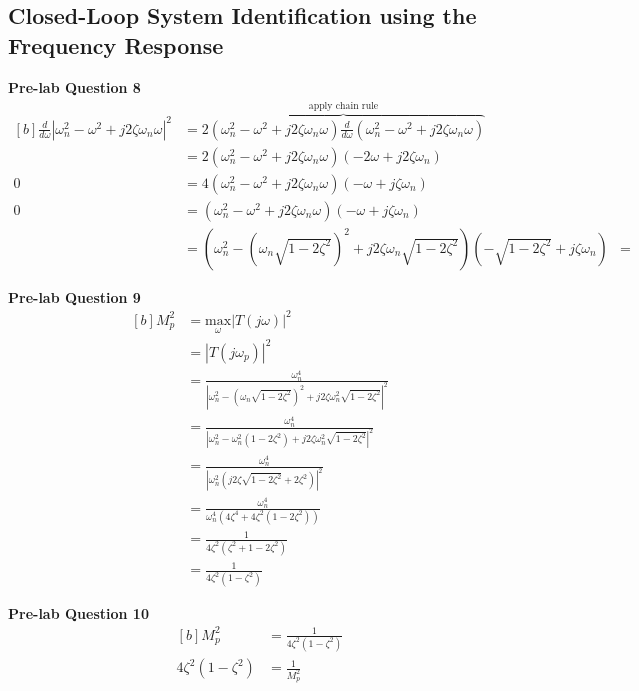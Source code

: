\documentclass[12pt]{article}
\begin{document}
\subsection{Closed-Loop System Identification using the Frequency Response}
\textbf{Pre-lab Question 8} \\
\begin{equation}
\begin{aligned}[b]
    \frac{d}{d\omega} \left|\omega_n^2 - \omega^2 + j2\zeta\omega_n\omega\right|^2 &= \overbrace{2 (\omega_n^2 - \omega^2 + j2\zeta\omega_n\omega) \frac{d}{d\omega} (\omega_n^2 - \omega^2 + j2\zeta\omega_n\omega)}^{\text{apply chain rule}} \\
    &= 2 (\omega_n^2 - \omega^2 + j2\zeta\omega_n\omega) (-2\omega + j2\zeta\omega_n) \\
    0 &= 4 (\omega_n^2 - \omega^2 + j2\zeta\omega_n\omega) (-\omega + j\zeta\omega_n) \\
    0 &= (\omega_n^2 - \omega^2 + j2\zeta\omega_n\omega) (-\omega + j\zeta\omega_n) \\
    &= (\omega_n^2 - (\omega_n\sqrt{1-2\zeta^2})^2 + j2\zeta\omega_n\sqrt{1-2\zeta^2}) (-\sqrt{1-2\zeta^2} + j\zeta\omega_n)
    &= 
\end{aligned}
\end{equation}

\textbf{Pre-lab Question 9} \\
\begin{equation} \label{eq:9}
\begin{aligned}[b]
    M_p^2 &= \underset{\omega}{\text{max}}\left| T(j\omega) \right|^2 \\
    &= \left| T(j\omega_p) \right|^2 \\
    &= \frac{\omega_n^4}{\left| \omega_n^2 - (\omega_n\sqrt{1-2\zeta^2})^2 + j2\zeta\omega_n^2\sqrt{1-2\zeta^2} \right|^2} \\
    &= \frac{\omega_n^4}{\left| \omega_n^2 - \omega_n^2(1-2\zeta^2) + j2\zeta\omega_n^2\sqrt{1-2\zeta^2} \right|^2} \\
    &= \frac{\omega_n^4}{\left| \omega_n^2 \left( j2\zeta\sqrt{1-2\zeta^2} + 2\zeta^2 \right) \right|^2} \\
    &= \frac{\omega_n^4}{\omega_n^4 (4\zeta^4 + 4\zeta^2 (1-2\zeta^2))} \\
    &= \frac{1}{4\zeta^2 (\zeta^2 + 1 - 2\zeta^2)} \\
    &= \frac{1}{4\zeta^2 (1 - \zeta^2)}
\end{aligned}
\end{equation}

\textbf{Pre-lab Question 10} \\
\begin{equation}
\begin{aligned}[b]
    M_p^2 &= \frac{1}{4\zeta^2 (1 - \zeta^2)} \\
    4\zeta^2 (1 - \zeta^2) &= \frac{1}{M_p^2} \\
\end{aligned}
\end{equation}
\end{document}
